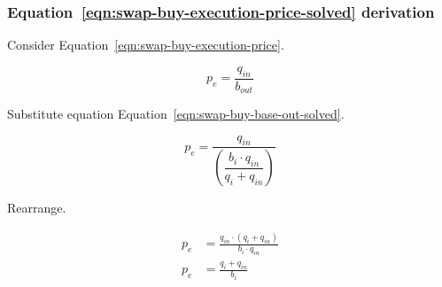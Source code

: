 \documentclass[table, twocolumn]{article}
\begin{document}
\subsubsection{Equation~\ref{eqn:swap-buy-execution-price-solved} derivation}%
\label{sssec:equation-eqn-swap-buy-execution-price-solved-derivation}

Consider Equation~\ref{eqn:swap-buy-execution-price}.

\begin{equation}
	p_e = \frac{q_{in}}{b_{out}} \nonumber
\end{equation}

Substitute equation Equation~\ref{eqn:swap-buy-base-out-solved}.

\begin{equation}
	p_e = \frac{q_{in}}{\left(\dfrac{b_i \cdot q_{in}}{q_i + q_{in}}\right)} \nonumber
\end{equation}

Rearrange.

\begin{align}
	p_e & = \frac{q_{in} \cdot (q_i + q_{in})}{b_i \cdot q_{in}} \nonumber \\
	p_e & = \frac{q_i + q_{in}}{b_i} \nonumber                             \\
\end{align}
\end{document}
